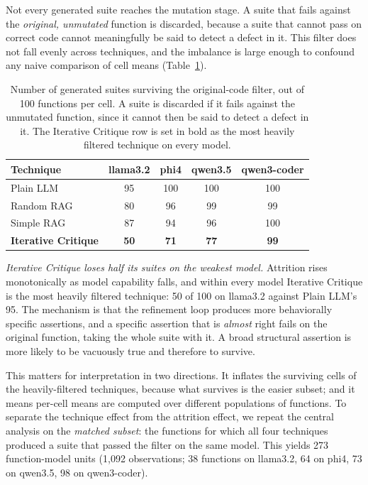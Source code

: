 \documentclass[smallextended]{svjour3}
\begin{document}
Not every generated suite reaches the mutation stage. A suite that
fails against the \emph{original, unmutated} function is discarded,
because a suite that cannot pass on correct code cannot
meaningfully be said to detect a defect in it. This filter does not
fall evenly across techniques, and the imbalance is large enough to
confound any naive comparison of cell means
(Table~\ref{tab:attrition}).

\begin{table}[t]
\centering
\caption{Number of generated suites surviving the original-code filter,
out of 100 functions per cell. A suite is discarded if it fails
against the unmutated function, since it cannot then be said to
detect a defect in it. The Iterative Critique row is set in bold as
the most heavily filtered technique on every model.}\label{tab:attrition}
\begin{tabular}{@{}lcccc@{}}
\toprule
Technique & llama3.2 & phi4 & qwen3.5 & qwen3-coder \\
\midrule
Plain LLM & 95 & 100 & 100 & 100 \\
Random RAG & 80 & 96 & 99 & 99 \\
Simple RAG & 87 & 94 & 96 & 100 \\
\textbf{Iterative Critique} & \textbf{50} & \textbf{71} & \textbf{77} & \textbf{99} \\
\bottomrule
\end{tabular}
\end{table}

\emph{Iterative Critique loses half its suites on the weakest
model.} Attrition rises monotonically as model capability falls, and
within every model Iterative Critique is the most heavily filtered
technique: 50 of 100 on llama3.2 against Plain LLM's 95. The mechanism
is that the refinement loop produces more behaviorally specific
assertions, and a specific assertion that is \emph{almost} right
fails on the original function, taking the whole suite with it. A
broad structural assertion is more likely to be vacuously true and
therefore to survive.

This matters for interpretation in two directions. It inflates the
surviving cells of the heavily-filtered techniques, because what
survives is the easier subset; and it means per-cell means are
computed over different populations of functions. To separate the
technique effect from the attrition effect, we repeat the central
analysis on the \emph{matched subset}: the functions for which all
four techniques produced a suite that passed the filter on the same
model. This yields 273 function-model units (1{,}092 observations;
38 functions on llama3.2, 64 on phi4, 73 on qwen3.5, 98 on
qwen3-coder).
\end{document}
